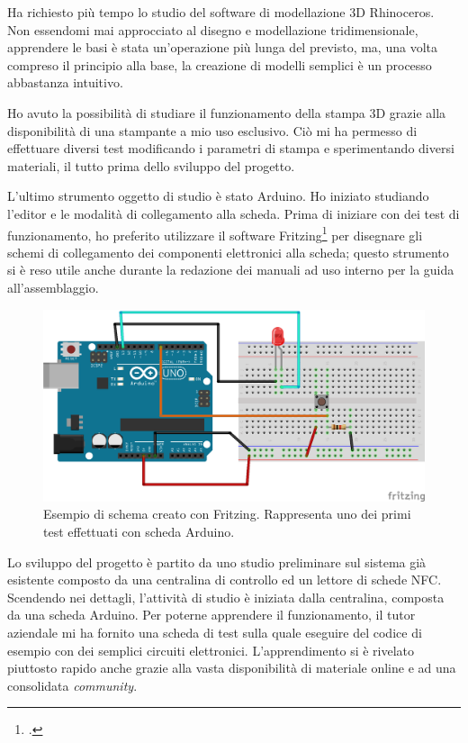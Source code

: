 \medskip

Ha richiesto più tempo lo studio del software di modellazione 3D Rhinoceros. Non essendomi mai approcciato al disegno e modellazione tridimensionale, apprendere le basi è stata un'operazione più lunga del previsto, ma, una volta compreso il principio alla base, la creazione di modelli semplici è un processo abbastanza intuitivo.

Ho avuto la possibilità di studiare il funzionamento della stampa 3D grazie alla disponibilità di una stampante a mio uso esclusivo. Ciò mi ha permesso di effettuare diversi test modificando i parametri di stampa e sperimentando diversi materiali, il tutto prima dello sviluppo del progetto.

\medskip

L'ultimo strumento oggetto di studio è stato Arduino. Ho iniziato studiando l'editor e le modalità di collegamento alla scheda. Prima di iniziare con dei test di funzionamento, ho preferito utilizzare il software Fritzing\footcite{http://fritzing.org/ [5]} per disegnare gli schemi di collegamento dei componenti elettronici alla scheda; questo strumento si è reso utile anche durante la redazione dei manuali ad uso interno per la guida all'assemblaggio.

\begin{figure}[H]
	\begin{center}
	\includegraphics[scale=0.62]{immagini/schema_arduino.png}
	\caption{Esempio di schema creato con Fritzing. Rappresenta uno dei primi test effettuati con scheda Arduino.}
	\end{center}
\end{figure}

Lo sviluppo del progetto è partito da uno studio preliminare sul sistema già esistente composto da una centralina di controllo ed un lettore di schede NFC.
Scendendo nei dettagli, l'attività di studio è iniziata dalla centralina, composta da una scheda Arduino. Per poterne apprendere il funzionamento, il tutor aziendale mi ha fornito una scheda di test sulla quale eseguire del codice di esempio con dei semplici circuiti elettronici. L'apprendimento si è rivelato piuttosto rapido anche grazie alla vasta disponibilità di materiale online e ad una consolidata \textit{community}.

